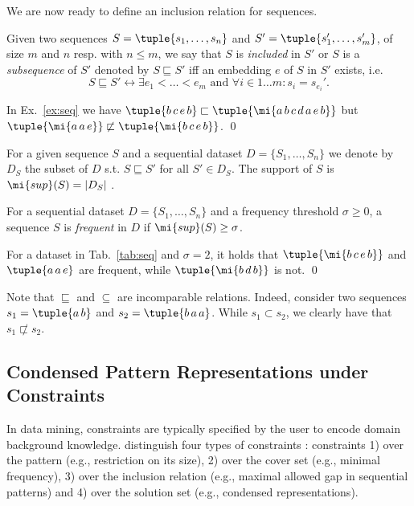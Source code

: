 We are now ready to define an inclusion relation for sequences. 

\begin{definition}\label{def:seqinc}
Given two sequences $S = \tuple{s_1,\dotsc, s_n}$ and $S'=\tuple{s_1',\dotsc, s_m'}$, of %
size $m$ and $n$ resp. with $n \leq m$, we say that $S$ is \emph{included} in $S'$ or $S$ is a \emph{subsequence} of $S'$ denoted by $S \sqsubseteq S'$ iff an embedding $e$ of $S$ in $S'$ exists, i.e.
\begin{equation}
S \sqsubseteq S' \leftrightarrow \exists e_1<\dotsc<e_m \text{ and }\forall i \in 1\dotsc m: s_i=s_{e_i}'.
\end{equation}
\end{definition}

\begin{example}
  In Ex.~\ref{ex:seq} we have  $\tuple{b\,c\,e\,b} \sqsubset \tuple{\mi{a\,b\,c\,d\,a\,e\,b}}$ but  $\tuple{\mi{a\,a\,e}} \not \sqsubset \tuple{\mi{b\, c\, e\, b}}$. \qed
\end{example}

For a given sequence $S$ and a sequential dataset $D=\{S_1,\dotsc,S_n\}$ we denote by $D_S$ the subset of $D$ s.t. $S \sqsubseteq S'$ for all $S' \in D_S$. The support of $S$ is $\mi{sup}(S)=|D_S|$ . 

\begin{definition}\label{def:frseq} For a sequential dataset $D=\{S_1,\dotsc, S_n\}$ and a frequency threshold $\sigma \geq 0$, a sequence $S$ is \emph{frequent} in $D$ if $\mi{sup}(S)\geq \sigma$. %
\end{definition}

\begin{example}
For a dataset in Tab.~\ref{tab:seq} and $\sigma=2$, it holds that $\tuple{\mi{b\,c\,e\,b}}$ and $\tuple{a\,a\,e}$ are frequent, while $\tuple{\mi{b\,d\,b}}$ is not. \qed
\end{example}

Note that $\sqsubseteq$ and $\subseteq$ are incomparable relations. Indeed, consider two sequences $s_1=\tuple{a\,b}$ and $s_2=\tuple{b\,a\,a}$. While $s_1\subset s_2$, we clearly have that $s_1 \not \sqsubset s_2$.

\subsection{Condensed Pattern Representations under Constraints}
In data mining, constraints are typically specified by the user to encode domain background knowledge. \cite{DBLP:conf/cpaior/NegrevergneG15} distinguish four types of constraints : constraints 1) over the pattern (e.g., restriction on its %
size), 2) over the cover set (e.g., minimal frequency), 3) over the inclusion relation (e.g., maximal allowed gap in sequential patterns) and 4) over the solution set (e.g., condensed representations).  

